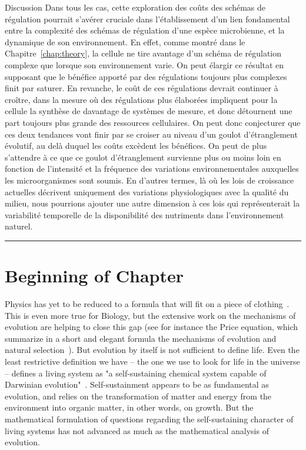 \begin{chapter_summary}{Discussion}
Dans tous les cas, cette exploration des coûts des schémas de régulation pourrait s'avérer cruciale dans l'établissement d'un lien fondamental entre la complexité des schémas de régulation d'une espèce microbienne, et la dynamique de son environnement.
En effet, comme montré dans le Chapitre~\ref{chap:theory}, la cellule ne tire avantage d'un schéma de régulation complexe que lorsque son environnement varie.
On peut élargir ce résultat en supposant que le bénéfice apporté par des régulations toujours plus complexes finit par saturer.
En revanche, le coût de ces régulations devrait continuer à croître, dans la mesure où des régulations plus élaborées impliquent pour la cellule la synthèse de davantage de systèmes de mesure, et donc détournent une part toujours plus grande des ressources cellulaires.
On peut donc conjecturer que ces deux tendances vont finir par se croiser au niveau d'un goulot d'étranglement évolutif, au delà duquel les coûts excèdent les bénéfices.
On peut de plus s'attendre à ce que ce goulot d'étranglement survienne plus ou moins loin en fonction de l'intensité et la fréquence des variations environnementales auxquelles les microorganismes sont soumis.
En d'autres termes, là où les lois de croissance actuelles décrivent uniquement des variations physiologiques avec la qualité du milieu, nous pourrions ajouter une autre dimension à ces lois qui représenterait la variabilité temporelle de la disponibilité des nutriments dans l'environnement naturel.
\end{chapter_summary}

\begin{center}
\noindent\rule{4cm}{0.1pt}
\end{center}

\section*{Beginning of Chapter \thechapter}

Physics has yet to be reduced to a formula that will fit on a piece of clothing~\cite{falk_universe_2005}.
This is even more true for Biology, but the extensive work on the mechanisms of evolution are helping to close this gap (see for instance the Price equation, which summarize in a short and elegant formula the mechanisms of evolution and natural selection~\cite{frank_natural_2012}).
But evolution by itself is not sufficient to define life.
Even the least restrictive definition we have -- the one we use to look for life in the universe -- defines a living system as "a self-sustaining chemical system capable of Darwinian evolution"~\cite{deamer_origins_1994,benner_defining_2010}.
Self-sustainment appears to be as fundamental as evolution, and relies on the transformation of matter and energy from the environment into organic matter, in other words, on growth.
But the mathematical formulation of questions regarding the self-sustaining character of living systems has not advanced as much as the mathematical analysis of evolution.

